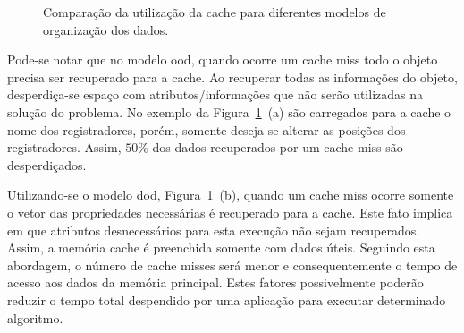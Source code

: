 \begin{figure}[bh]
    \caption[Comparação da utilização da cache]{Comparação da utilização da cache para diferentes modelos de organização dos dados.}
    \label{fig:cache_register_clustering}
\end{figure}

Pode-se notar que no modelo \ac{ood}, quando ocorre um cache miss todo o objeto precisa ser recuperado para a cache. Ao recuperar todas as informações do objeto, desperdiça-se espaço com atributos/informações que não serão utilizadas na solução do problema. No exemplo da Figura~\ref{fig:cache_register_clustering}~(a) são carregados para a cache o nome dos registradores, porém, somente deseja-se alterar as posições dos registradores. Assim, $50\%$ dos dados recuperados por um cache miss são desperdiçados.



Utilizando-se o modelo \ac{dod}, Figura~\ref{fig:cache_register_clustering}~(b), quando um cache miss ocorre somente o vetor das propriedades necessárias é recuperado para a cache. Este fato implica em que atributos desnecessários para esta execução não sejam recuperados. Assim, a memória cache é preenchida somente com dados úteis.
Seguindo esta abordagem, o número de cache misses será menor e consequentemente o tempo de acesso aos dados da memória principal. Estes fatores possivelmente poderão reduzir o tempo total despendido por uma aplicação para executar determinado algoritmo.



